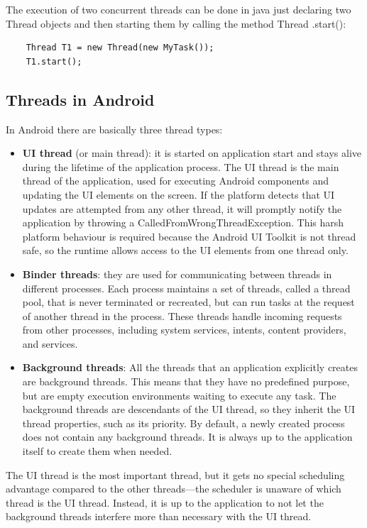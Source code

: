 The execution of two concurrent threads can be done in java just declaring two Thread objects and then starting them by calling the method Thread .start():
\begin{lstlisting}
	Thread T1 = new Thread(new MyTask());
	T1.start();
\end{lstlisting}

\subsection{Threads in Android}
In Android there are basically three thread types:
\begin{itemize}
	\item \textbf{UI thread} (or main thread): it is started on application start and stays alive during the lifetime of the application process. The UI thread is the main thread of the application, used for executing Android components and updating the UI elements on the screen. If the platform detects that UI updates are attempted from any other thread, it will promptly notify the application by throwing a CalledFromWrongThreadException. This harsh platform behaviour is required because the Android UI Toolkit is not thread safe, so the runtime allows access to the UI elements from one thread only.
	\item \textbf{Binder threads}: they are used for communicating between threads in different processes. Each process maintains a set of threads, called a thread pool, that is never terminated or recreated, but can run tasks at the request of another thread in the process. These threads handle incoming requests from other processes, including system services, intents, content providers, and services.
	\item \textbf{Background threads}: All the threads that an application explicitly creates are background threads. This means that they have no predefined purpose, but are empty execution environments waiting to execute any task. The background threads are descendants of the UI thread, so they inherit the UI thread properties, such as its priority. By default, a newly created process does not contain any background threads. It is always up to the application itself to create them when needed.
\end{itemize}
The UI thread is the most important thread, but it gets no special scheduling advantage compared to the other threads—the scheduler is unaware of which thread is the UI thread. Instead, it is up to the application to not let the background threads interfere more than necessary with the UI thread.

